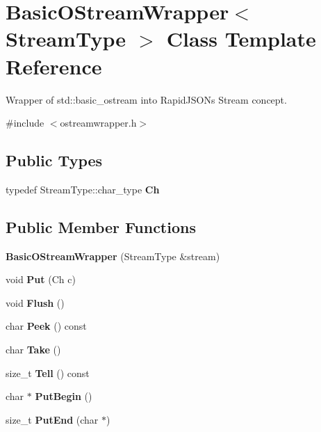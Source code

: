 \hypertarget{a02304}{}\section{Basic\+O\+Stream\+Wrapper$<$ Stream\+Type $>$ Class Template Reference}
\label{a02304}


Wrapper of {\ttfamily std\+::basic\+\_\+ostream} into Rapid\+J\+S\+ON\textquotesingle{}s Stream concept.  




{\ttfamily \#include $<$ostreamwrapper.\+h$>$}

\subsection*{Public Types}
\begin{DoxyCompactItemize}
\item 
\mbox{\label{a02304_aafc6276f1f5cc0b8d45d137584d380bb}} 
typedef Stream\+Type\+::char\+\_\+type {\bfseries Ch}
\end{DoxyCompactItemize}
\subsection*{Public Member Functions}
\begin{DoxyCompactItemize}
\item 
\mbox{\label{a02304_a067a516c13b7c9d4dacef598d32779ef}} 
{\bfseries Basic\+O\+Stream\+Wrapper} (Stream\+Type \&stream)
\item 
\mbox{\label{a02304_a7d3ba9d651fbe27fe05387f512154ea8}} 
void {\bfseries Put} (Ch c)
\item 
\mbox{\label{a02304_a1c48a8b7520b0ab6ca34e665b928b56d}} 
void {\bfseries Flush} ()
\item 
\mbox{\label{a02304_a6dc18ded82487d41a2d123e21a9e050b}} 
char {\bfseries Peek} () const
\item 
\mbox{\label{a02304_a54be63e8d24f4d82329b860a907f65fe}} 
char {\bfseries Take} ()
\item 
\mbox{\label{a02304_a62f214649fbfb8380a69fe92b864a61b}} 
size\+\_\+t {\bfseries Tell} () const
\item 
\mbox{\label{a02304_a564b7b727bdab12185e7a7bd1ac5e822}} 
char $\ast$ {\bfseries Put\+Begin} ()
\item 
\mbox{\label{a02304_a1da108e43a5a517c4484821fced1fca0}} 
size\+\_\+t {\bfseries Put\+End} (char $\ast$)
\end{DoxyCompactItemize}


